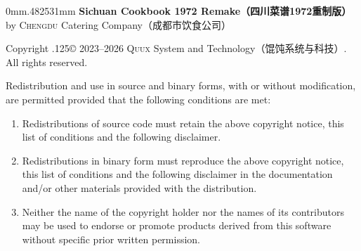 %
\begin{adjustwidth}{0mm}{.482531mm}
{\sffamily\bfseries Sichuan Cookbook 1972 Remake\!（四川菜谱1972重制版）}\\%
by \textsc{Chengdu} Catering Company\!（成都市饮食公司）

\vspace{.6875\baselineskip}

Copyright {\lower.125\baselineskip\hbox{\copyright}} 2023--2026
\textsc{Quux} System and Technology\!（馄饨系统与科技）\!\!\!.\\%
All rights reserved.

Redistribution and use in source and binary forms, with or without
modification, are permitted provided that the following conditions are met:

\vspace{-.5\baselineskip}
\begin{enumerate}
\item Redistributions of source code must retain the above copyright notice,
      this list of conditions and the following disclaimer.

\item Redistributions in binary form must reproduce the above copyright notice,
      this list of conditions and the following disclaimer in the documentation
      and\slash or other materials provided with the distribution.

\item Neither the name of the copyright holder nor the names of its
      contributors may be used to endorse or promote products derived from
      this software without specific prior written permission.
\end{enumerate}
\vspace{-.5\baselineskip}


\end{adjustwidth}
